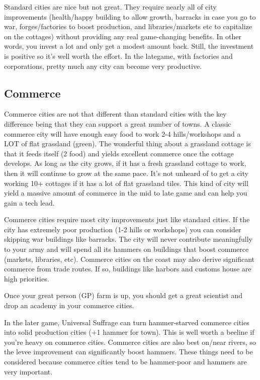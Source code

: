 \documentclass[10pt]{article}
\begin{document}
Standard cities are nice but not great. They require nearly all of
city improvements (health/happy building to allow growth, barracks in
case you go to war, forges/factories to boost production, and
libraries/markets etc to capitalize on the cottages) without providing
any real game-changing benefits. In other words, you invest a lot and
only get a modest amount back. Still, the investment is positive so
it's well worth the effort.  In the lategame, with factories and
corporations, pretty much any city can become very productive.

\subsection*{Commerce}

Commerce cities are not that different than standard cities with the key difference
being that they can support a great number of towns. A classic commerce city will
have enough easy food to work 2-4 hills/workshops and a LOT of flat grassland (green).
The wonderful thing about a grassland cottage is that it feeds itself (2 food) and
yields excellent commerce once the cottage develops. As long as the city grows, if it
has a fresh grassland cottage to work, then it will continue to grow at the same pace.
It's not unheard of to get a city working 10+ cottages if it has a lot of flat grassland
tiles. This kind of city will yield a massive amount of commerce in the mid to late game
and can help you gain a tech lead.

Commerce cities require most city improvements just like standard cities. If the city
has extremely poor production (1-2 hills or workshops) you can consider skipping war
buildings like barracks. The city will never contribute meaningfully to your army and
will spend all its hammers on buildings that boost commerce (markets, libraries, etc).
Commerce cities on the coast may also derive significant commerce from trade routes.
If so, buildings like harbors and customs house are high priorities.

Once your great person (GP) farm is up, you should get a great scientist and drop an
academy in your commerce cities.

In the later game, Universal Suffrage can turn hammer-starved commerce cities into
solid production cities (+1 hammer for town). This is well worth a beeline if you're
heavy on commerce cities. Commerce cities are also best on/near rivers, so the levee
improvement can significantly boost hammers. These things need to be considered because
commerce cities tend to be hammer-poor and hammers are very important.
\end{document}
